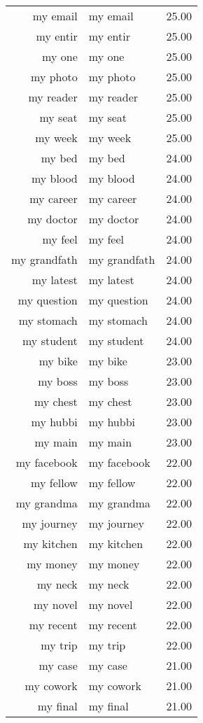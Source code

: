 \begin{table}[ht]
\begin{tabular}{rlr}
  my email & my email & 25.00 \\ 
  my entir & my entir & 25.00 \\ 
  my one & my one & 25.00 \\ 
  my photo & my photo & 25.00 \\ 
  my reader & my reader & 25.00 \\ 
  my seat & my seat & 25.00 \\ 
  my week & my week & 25.00 \\ 
  my bed & my bed & 24.00 \\ 
  my blood & my blood & 24.00 \\ 
  my career & my career & 24.00 \\ 
  my doctor & my doctor & 24.00 \\ 
  my feel & my feel & 24.00 \\ 
  my grandfath & my grandfath & 24.00 \\ 
  my latest & my latest & 24.00 \\ 
  my question & my question & 24.00 \\ 
  my stomach & my stomach & 24.00 \\ 
  my student & my student & 24.00 \\ 
  my bike & my bike & 23.00 \\ 
  my boss & my boss & 23.00 \\ 
  my chest & my chest & 23.00 \\ 
  my hubbi & my hubbi & 23.00 \\ 
  my main & my main & 23.00 \\ 
  my facebook & my facebook & 22.00 \\ 
  my fellow & my fellow & 22.00 \\ 
  my grandma & my grandma & 22.00 \\ 
  my journey & my journey & 22.00 \\ 
  my kitchen & my kitchen & 22.00 \\ 
  my money & my money & 22.00 \\ 
  my neck & my neck & 22.00 \\ 
  my novel & my novel & 22.00 \\ 
  my recent & my recent & 22.00 \\ 
  my trip & my trip & 22.00 \\ 
  my case & my case & 21.00 \\ 
  my cowork & my cowork & 21.00 \\ 
  my final & my final & 21.00 \\ 

\end{tabular}
\end{table}
